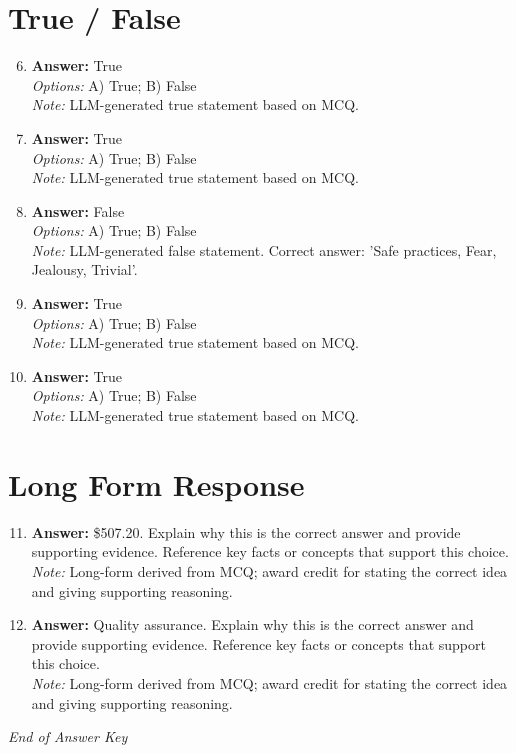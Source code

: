 \documentclass[12pt]{article}
\begin{document}
\section*{True / False}
\begin{enumerate}[label=\arabic*.]
\setcounter{enumi}{5}
\item \textbf{Answer:} True
\\ \textit{Options:} A) True; B) False
\\ \textit{Note:} LLM-generated true statement based on MCQ.
\item \textbf{Answer:} True
\\ \textit{Options:} A) True; B) False
\\ \textit{Note:} LLM-generated true statement based on MCQ.
\item \textbf{Answer:} False
\\ \textit{Options:} A) True; B) False
\\ \textit{Note:} LLM-generated false statement. Correct answer: 'Safe practices, Fear, Jealousy, Trivial'.
\item \textbf{Answer:} True
\\ \textit{Options:} A) True; B) False
\\ \textit{Note:} LLM-generated true statement based on MCQ.
\item \textbf{Answer:} True
\\ \textit{Options:} A) True; B) False
\\ \textit{Note:} LLM-generated true statement based on MCQ.
\end{enumerate}

\section*{Long Form Response}
\begin{enumerate}[label=\arabic*.]
\setcounter{enumi}{10}
\item \textbf{Answer:} \$507.20. Explain why this is the correct answer and provide supporting evidence. Reference key facts or concepts that support this choice.
\\ \textit{Note:} Long-form derived from MCQ; award credit for stating the correct idea and giving supporting reasoning.
\item \textbf{Answer:} Quality assurance. Explain why this is the correct answer and provide supporting evidence. Reference key facts or concepts that support this choice.
\\ \textit{Note:} Long-form derived from MCQ; award credit for stating the correct idea and giving supporting reasoning.
\end{enumerate}

\vfill
\noindent\textit{End of Answer Key}
\end{document}

